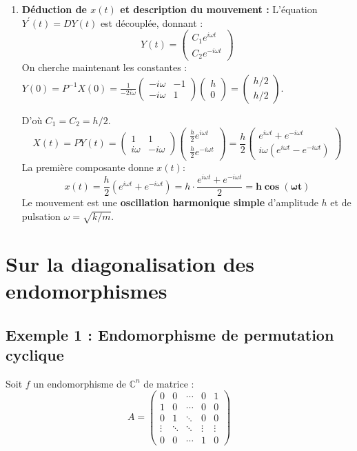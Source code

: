 \documentclass[french]{yLectureNote}
\begin{document}
\begin{enumerate}
    Comme $B = P D P^{-1}$, alors $Y^{\prime}(t) = P^{-1} (P D P^{-1}) X(t) = D (P^{-1} X(t)) = \mathbf{D Y(t)}$.

    $Y(0) = \mathbf{P^{-1}X(0)}$ par substitution.

    \item \textbf{Déduction de $x(t)$ et description du mouvement :}
    L'équation $Y^{\prime}(t) = D Y(t)$ est découplée, donnant :
    $$Y(t) = \begin{pmatrix} C_1 e^{i\omega t} \\ C_2 e^{-i\omega t} \end{pmatrix}$$
    On cherche maintenant les constantes :
    $Y(0) = P^{-1}X(0) = \frac{1}{-2i\omega} \begin{pmatrix} -i\omega&-1\\ -i\omega&1 \end{pmatrix} \begin{pmatrix} h\\ 0 \end{pmatrix} = \begin{pmatrix} h/2 \\ h/2 \end{pmatrix}$.

    D'où $C_1 = C_2 = h/2$.
    $$X(t) = P Y(t) = \begin{pmatrix} 1&1\\ i\omega&-i\omega \end{pmatrix} \begin{pmatrix} \frac{h}{2} e^{i\omega t} \\ \frac{h}{2} e^{-i\omega t} \end{pmatrix} = \frac{h}{2} \begin{pmatrix} e^{i\omega t} + e^{-i\omega t} \\ i\omega (e^{i\omega t} - e^{-i\omega t}) \end{pmatrix}$$
    La première composante donne $x(t)$:
    $$x(t) = \frac{h}{2} (e^{i\omega t} + e^{-i\omega t}) = h \cdot \frac{e^{i\omega t} + e^{-i\omega t}}{2} = \mathbf{h \cos(\omega t)}$$
    Le mouvement est une \textbf{oscillation harmonique simple} d'amplitude $h$ et de pulsation $\omega = \sqrt{k/m}$.
\end{enumerate}
\section{Sur la diagonalisation des endomorphismes}

\subsection{Exemple 1 : Endomorphisme de permutation cyclique}
Soit $f$ un endomorphisme de $\mathbb{C}^n$ de matrice :
$$A = \begin{pmatrix} 0 & 0 & \cdots & 0 & 1 \\ 1 & 0 & \cdots & 0 & 0 \\ 0 & 1 & \ddots & 0 & 0 \\ \vdots & \ddots & \ddots & \vdots & \vdots \\ 0 & 0 & \cdots & 1 & 0 \end{pmatrix}$$
\end{document}
